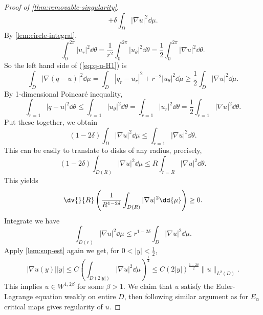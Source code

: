 \documentclass[UTF8,12pt]{article}
\theoremstyle{plain}\newtheorem{theorem}{Theorem}
\theoremstyle{definition}\newtheorem{definition}[theorem]{Definition}
\theoremstyle{definition}\newtheorem{example}[theorem]{Example}
\theoremstyle{plain}\newtheorem{axiom}[theorem]{Axiom}
\theoremstyle{plain}\newtheorem{assertion}[theorem]{Assertion}
\theoremstyle{plain}\newtheorem{corollary}[theorem]{Corollary}
\theoremstyle{plain}\newtheorem{lemma}[theorem]{Lemma}
\theoremstyle{plain}\newtheorem{proposition}[theorem]{Proposition}
\theoremstyle{plain}\newtheorem{prop}[theorem]{Proposition}
\theoremstyle{plain}\newtheorem{conjecture}[theorem]{Conjecture}
\theoremstyle{plain}\newtheorem{conj}[theorem]{Conjecture}
\theoremstyle{plain}\newtheorem{problem}[theorem]{Problem}
\theoremstyle{remark}\newtheorem{notation}[theorem]{Notation}
\theoremstyle{definition}\newtheorem*{question}{Question}
\theoremstyle{definition}\newtheorem*{answer}{Answer}
\theoremstyle{definition}\newtheorem*{goal}{Goal}
\theoremstyle{plain}\newtheorem*{application}{Application}
\theoremstyle{plain}\newtheorem*{exercise}{Exercise}
\theoremstyle{remark}\newtheorem*{remark}{Remark}
\theoremstyle{remark}\newtheorem*{note}{\small{Note}}
\numberwithin{equation}{section}
\numberwithin{theorem}{section}
\numberwithin{figure}{section}
\begin{document}
\begin{proof}[Proof of \cref{thm:removable-singularity}]
\begin{equation}
        +\delta \int_{D}|\nabla u|^2\dd{\mu}
    .\end{equation}
    By \cref{lem:circle-integral}, \[
        \int_{0}^{2\pi}|u_r|^2\dd{\theta}
        =\frac{1}{r^2}\int_{0}^{2\pi}|u_\theta|^2\dd{\theta}
        =\frac{1}{2}\int_{0}^{2\pi}|\nabla u|^2\dd{\theta}
    .\] So the left hand side of (\ref{eq:q-u-H1}) is \[
        \int_{D}|\nabla (q-u)|^2\dd{\mu}
        =\int_{D}|q_r-u_r|^2+r^{-2}|u_\theta|^2\dd{\mu}
        \ge \frac{1}{2}\int_{D}|\nabla u|^2\dd{\mu}
    .\] By 1-dimensional Poincaré inequality, \[
        \int_{r=1}|q-u|^2\dd{\theta}\le \int_{r=1}|u_\theta|^2\dd{\theta}
        =\int_{r=1}|u_r|^2\dd{\theta}=\frac{1}{2}\int_{r=1}|\nabla u|^2\dd{\theta}
    .\] Put these together, we obtain \[
        (1-2\delta)\int_{D}|\nabla u|^2\dd{\mu}\le \int_{r=1}|\nabla u|^2\dd{\theta}
    .\] This can be easily to translate to disks of any radius, precisely, \[
        (1-2\delta)\int_{D(R)}|\nabla u|^2\dd{\mu}
        \le R\int_{r=R}|\nabla u|^2\dd{\theta}
    .\] This yields \[
        \dv{}{R}\left(\frac{1}{R^{1-2\delta}}\int_{D(R)}|\nabla u|^2\dd{\mu}\right)\ge 0
    .\] Integrate we have \[
        \int_{D(r)}|\nabla u|^2\dd{\mu}\le r^{1-2\delta}\int_{D}|\nabla u|^2\dd{\mu}
    .\] Apply \cref{lem:sup-est} again we get, for \(0<|y|<\frac{1}{2}\), \[
        |\nabla u(y)||y|
        \le C\left(\int_{D(2|y|)}|\nabla u|^2\dd{\mu}\right)^{\frac{1}{2}}
        \le C(2|y|)^{\frac{1-2\delta}{2}}\|u\|_{L^2(D)}
    .\] This implies \(u\in W^{1,2\beta}\) for some \(\beta>1\).
    We claim that \(u\) satisfy the Euler-Lagrange equation weakly on entire \(D\),
    then following similar argument as for \(E_\alpha\) critical maps gives
    regularity of \(u\).
\end{proof}
\end{document}
